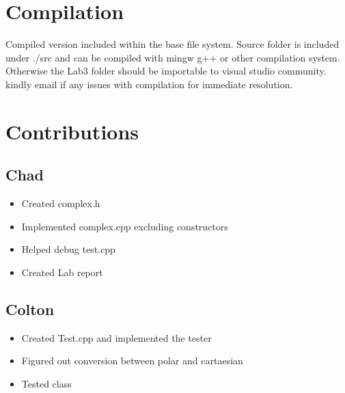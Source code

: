 \documentclass[11pt]{article}
\begin{document}
\section{Compilation}
Compiled version included within the base file system. Source folder is included under ./src and can be compiled with mingw g++ or other compilation system. Otherwise the Lab3 folder should be importable to visual studio community. kindly email if any issues with compilation for immediate resolution.

\newpage
\section{Contributions}
\subsection{Chad}
\begin{itemize}
\item Created complex.h
\item Implemented complex.cpp excluding constructors
\item Helped debug test.cpp
\item Created Lab report
\end{itemize}
\subsection{Colton}
\begin{itemize}
\item Created Test.cpp and implemented the tester
\item Figured out conversion between polar and cartaesian
\item Tested class
\end{itemize}
\end{document}
